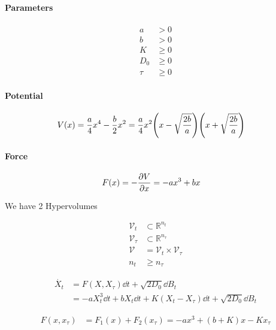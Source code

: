 \documentclass[a4paper,10pt]{article}
\begin{document}
\paragraph{Parameters}

\begin{align}
	a&>0
\\
	b&>0
\\
	K&\geq 0
\\
	D_0
	&\geq 0
\\
	\tau
	&\geq 0
\end{align}


\paragraph{Potential}

\begin{align}
	V(x)
	&=
	\frac{a}{4}
	x^4
	-
	\frac{b}{2}
	x^2
	=
	\frac{a}{4}
	x^2
	\pqty{
		x-\sqrt{\frac{2b}{a}}
	}
	\pqty{
		x+\sqrt{\frac{2b}{a}}	
	}
\end{align}

\paragraph{Force}

\begin{align}
	F(x)
	&=
	-\pdv{V}{x}
	=
	-
	a
	x^3
	+
	b
	x
\end{align}


We have 2 Hypervolumes

\begin{align}
	\mathcal{V}_t
	&\subset
	\mathbb{R}^{n_t}
\\
	\mathcal{V}_\tau
	&\subset
	\mathbb{R}^{n_\tau}
\\
	\mathcal{V}
	&=
	\mathcal{V}_t
	\times
	\mathcal{V}_\tau
\\
	n_t
	&\geq
	n_\tau
\end{align}


\begin{align}
	\dot{X_t}
	&=
	F(X,X_\tau)
	\dd{t}
	+
	\sqrt{2D_0}
	\dd{B}_t
\\	
	&=
	-
	a
	X_t^3
	\dd{t}
	+
	b
	X_t
	\dd{t}
	+
	K
	(X_t-X_\tau)
	\dd{t}
	+
	\sqrt{2D_0}
	\dd{B}_t
\end{align}

\begin{align}
	F(x,x_\tau)
	&=
	F_1(x)
	+
	F_2(x_\tau)
	=
	-
	ax^3
	+
	(b+K)x
	-
	Kx_\tau
\end{align}
\end{document}
